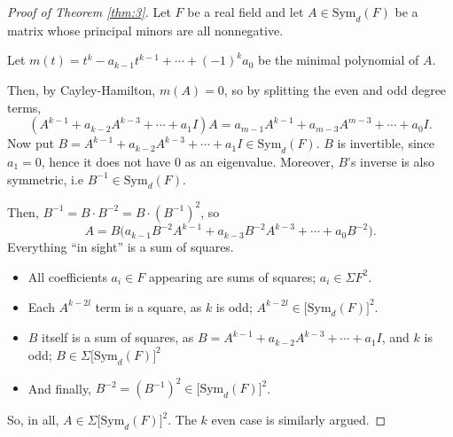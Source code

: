 \documentclass{article}
\newcommand*\Sym{\mathrm{Sym}}
\begin{document}
\begin{proof}
    [Proof of Theorem \ref{thm:3}]
    Let $F$ be a real field and let $A \in \Sym_d(F)$ be a matrix whose principal minors are all nonnegative.

    Let $m(t) = t^k - a_{k-1}t^{k-1} + \cdots + (-1)^k a_0$ be the minimal polynomial of $A$.

    Then, by Cayley-Hamilton, $m(A) = 0$, so by splitting the even and odd degree terms, 
    \[
        (A^{k-1} + a_{k-2}A^{k-3} + \cdots + a_1I)A
        =
        a_{m-1}A^{k-1} + a_{m-3}A^{m-3} + \cdots + a_0I.
    \]
    Now put $B = A^{k-1} + a_{k-2}A^{k-3} + \cdots + a_1I \in \Sym_d(F)$.
    $B$ is invertible, since $a_1 = 0$, hence it does not have $0$ as an eigenvalue.
    Moreover, $B$'s inverse is also symmetric, i.e $B^{-1} \in \Sym_d(F)$.

    Then, $B^{-1} = B \cdot B^{-2} = B \cdot (B^{-1})^2$, so
    \[
        A
        =
        B\Big(
            a_{k-1}B^{-2}A^{k-1}
            + a_{k-3}B^{-2}A^{k-3}
            + \cdots
            + a_0 B^{-2}
        \Big).
    \]
    Everything ``in sight'' is a sum of squares.
    \begin{itemize}
        \item
            All coefficients $a_i \in F$ appearing are sums of squares; $a_i \in \Sigma F^2$.
        \item
            Each $A^{k-2l}$ term is a square, as $k$ is odd; $A^{k-2l} \in \big[\Sym_d(F)\big]^2$. 
        \item 
            $B$ itself is a sum of squares, as $B = A^{k-1} + a_{k-2}A^{k-3} + \cdots + a_1I$, and $k$ is odd; $B \in \Sigma \big[\Sym_d(F)\big]^2$
        \item 
            And finally, $B^{-2} = (B^{-1})^2 \in \big[\Sym_d(F)\big]^2$.
    \end{itemize}
    So, in all, $A \in \Sigma \big[\Sym_d(F)\big]^2$.
    The $k$ even case is similarly argued.
\end{proof}
\end{document}
